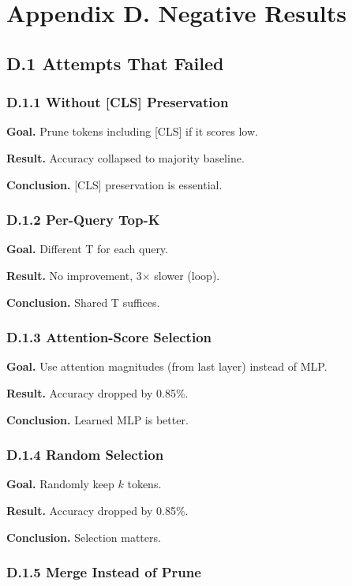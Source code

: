 
\section{Appendix D. Negative Results}

\subsection{D.1 Attempts That Failed}

\subsubsection{D.1.1 Without [CLS] Preservation}

\textbf{Goal.} Prune tokens including [CLS] if it scores low.

\textbf{Result.} Accuracy collapsed to majority baseline.

\textbf{Conclusion.} [CLS] preservation is essential.

\subsubsection{D.1.2 Per-Query Top-K}

\textbf{Goal.} Different T for each query.

\textbf{Result.} No improvement, 3$\times$ slower (loop).

\textbf{Conclusion.} Shared T suffices.

\subsubsection{D.1.3 Attention-Score Selection}

\textbf{Goal.} Use attention magnitudes (from last layer) instead of MLP.

\textbf{Result.} Accuracy dropped by 0.85\%.

\textbf{Conclusion.} Learned MLP is better.

\subsubsection{D.1.4 Random Selection}

\textbf{Goal.} Randomly keep $k$ tokens.

\textbf{Result.} Accuracy dropped by 0.85\%.

\textbf{Conclusion.} Selection matters.

\subsubsection{D.1.5 Merge Instead of Prune}


